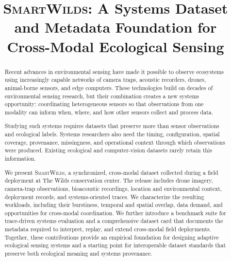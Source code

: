 \documentclass[manuscript]{acmart}
\newcommand{\smartwilds}{\textsc{SmartWilds}\xspace}
\begin{document}
\title{\smartwilds: A Systems Dataset and Metadata Foundation for
Cross-Modal Ecological Sensing}

%


\begin{abstract}
Recent advances in environmental sensing have made it possible to
observe ecosystems using increasingly capable networks of camera
traps, acoustic recorders, drones, animal-borne sensors, and edge
computers. These technologies build on decades of environmental
sensing research, but their combination creates a new systems
opportunity: coordinating heterogeneous sensors so that observations
from one modality can inform when, where, and how other sensors
collect and process data.

Studying such systems requires datasets that preserve more than sensor
observations and ecological labels. Systems researchers also need the
timing, configuration, spatial coverage, provenance, missingness, and
operational context through which observations were produced. Existing
ecological and computer-vision datasets rarely retain this information.

We present \smartwilds, a synchronized, cross-modal dataset collected
during a field deployment at The Wilds conservation center. The release
includes drone imagery, camera-trap observations, bioacoustic
recordings, location and environmental context, deployment records, and
systems-oriented traces. We characterize the resulting workloads,
including their burstiness, temporal and spatial overlap, data demand,
and opportunities for cross-modal coordination. We further introduce a
benchmark suite for trace-driven systems evaluation and a comprehensive
dataset card that documents the metadata required to interpret, replay,
and extend cross-modal field deployments. Together, these contributions
provide an empirical foundation for designing adaptive ecological
sensing systems and a starting point for interoperable dataset
standards that preserve both ecological meaning and systems provenance.
\end{abstract}
\end{document}
